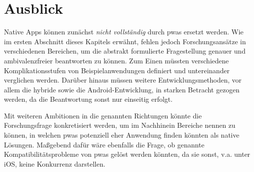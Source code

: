 \section{Ausblick}
Native Apps können zunächst \textit{nicht vollständig} durch \acp{pwa} ersetzt werden. Wie im ersten Abschnitt dieses Kapitels erwähnt, fehlen jedoch Forschungsansätze in verschiedenen Bereichen, um die abstrakt formulierte Fragestellung genauer und ambivalenzfreier beantworten zu können. Zum Einen müssten verschiedene Komplikationsstufen von Beispielanwendungen definiert und untereinander verglichen werden. Darüber hinaus müssen weitere Entwicklungsmethoden, vor allem die hybride sowie die Android-Entwicklung, in starken Betracht gezogen werden, da die Beantwortung sonst nur einseitig erfolgt.

Mit weiteren Ambitionen in die genannten Richtungen könnte die Forschungsfrage konkretisiert werden, um im Nachhinein Bereiche nennen zu können, in welchen \acp{pwa} potenziell eher Anwendung finden könnten als native Lösungen. Maßgebend dafür wäre ebenfalls die Frage, ob genannte Kompatibilitätsprobleme von \acp{pwa} gelöst werden könnten, da sie sonst, v.a. unter iOS, keine Konkurrenz darstellen.